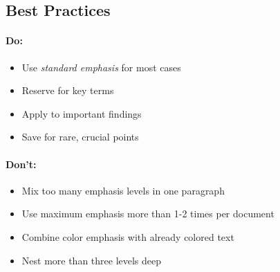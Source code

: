 \documentclass{article}
\begin{document}
\subsection{Best Practices}

\paragraph{Do:}
\begin{itemize}
\item Use \emph{standard emphasis} for most cases
\item Reserve  for key terms
\item Apply  to important findings
\item Save  for rare, crucial points
\end{itemize}

\paragraph{Don't:}
\begin{itemize}
\item Mix too many emphasis levels in one paragraph
\item Use maximum emphasis more than 1-2 times per document
\item Combine color emphasis with already colored text
\item Nest more than three levels deep
\end{itemize}
\end{document}
